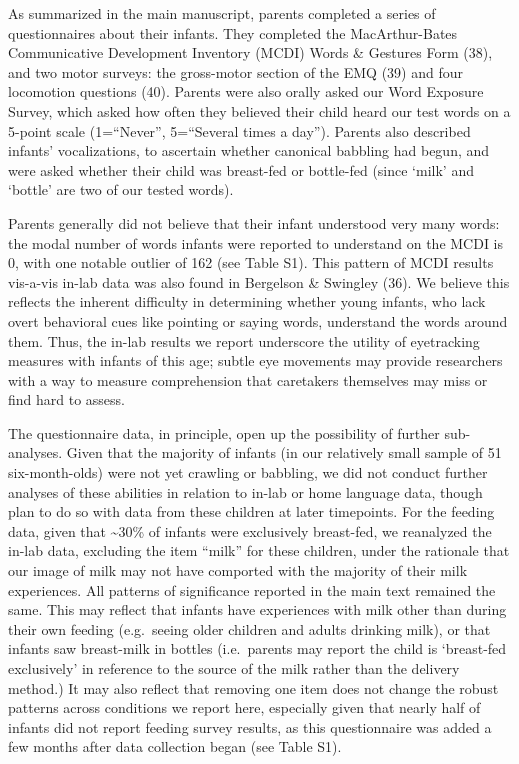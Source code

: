 \documentclass[]{article}
\begin{document}
As summarized in the main manuscript, parents completed a series of
questionnaires about their infants. They completed the MacArthur-Bates
Communicative Development Inventory (MCDI) Words \& Gestures Form (38),
and two motor surveys: the gross-motor section of the EMQ (39) and four
locomotion questions (40). Parents were also orally asked our Word
Exposure Survey, which asked how often they believed their child heard
our test words on a 5-point scale (1=``Never'', 5=``Several times a
day''). Parents also described infants' vocalizations, to ascertain
whether canonical babbling had begun, and were asked whether their child
was breast-fed or bottle-fed (since `milk' and `bottle' are two of our
tested words).

Parents generally did not believe that their infant understood very many
words: the modal number of words infants were reported to understand on
the MCDI is 0, with one notable outlier of 162 (see Table S1). This
pattern of MCDI results vis-a-vis in-lab data was also found in
Bergelson \& Swingley (36). We believe this reflects the inherent
difficulty in determining whether young infants, who lack overt
behavioral cues like pointing or saying words, understand the words
around them. Thus, the in-lab results we report underscore the utility
of eyetracking measures with infants of this age; subtle eye movements
may provide researchers with a way to measure comprehension that
caretakers themselves may miss or find hard to assess.

The questionnaire data, in principle, open up the possibility of further
sub-analyses. Given that the majority of infants (in our relatively
small sample of 51 six-month-olds) were not yet crawling or babbling, we
did not conduct further analyses of these abilities in relation to
in-lab or home language data, though plan to do so with data from these
children at later timepoints. For the feeding data, given that
\textasciitilde{}30\% of infants were exclusively breast-fed, we
reanalyzed the in-lab data, excluding the item ``milk'' for these
children, under the rationale that our image of milk may not have
comported with the majority of their milk experiences. All patterns of
significance reported in the main text remained the same. This may
reflect that infants have experiences with milk other than during their
own feeding (e.g.~seeing older children and adults drinking milk), or
that infants saw breast-milk in bottles (i.e.~parents may report the
child is `breast-fed exclusively' in reference to the source of the milk
rather than the delivery method.) It may also reflect that removing one
item does not change the robust patterns across conditions we report
here, especially given that nearly half of infants did not report
feeding survey results, as this questionnaire was added a few months
after data collection began (see Table S1).
\end{document}

